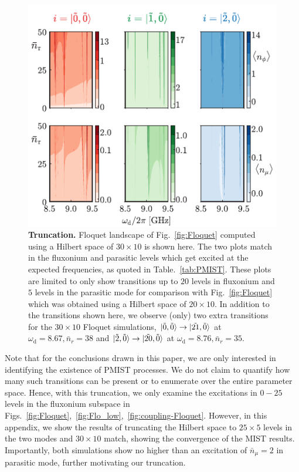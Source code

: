 \documentclass[%
reprint,
superscriptaddress,
 amsmath,amssymb,
 aps,
 prx,
longbibliography,
floatfix,
]{revtex4-2}
\begin{document}
\begin{figure}[t]
        \centering
        \includegraphics[width=\linewidth]{Supp_Fig/Tuncation.pdf}
        \caption{{\bf Truncation.} Floquet landscape of Fig.~\ref{fig:Floquet} computed using a Hilbert space of $30\times 10$ is shown here. The two plots match in the fluxonium and parasitic levels which get excited at the expected frequencies, as quoted in Table.~\ref{tab:PMIST}. These plots are limited to only show transitions up to $20$ levels in fluxonium and $5$ levels in the parasitic mode for comparison with Fig.~\ref{fig:Floquet} which was obtained using a Hilbert space of $20\times 10$. In addition to the transitions shown here, we observe (only) two extra transitions for the $30\times 10$ Floquet simulations, $\ket{\tilde{0},\tilde{0}}\rightarrow\ket{\tilde{21},\tilde{0}}$ at $\omega_\textrm{d}=8.67,\bar n_r=38$ and $\ket{\tilde{2},\tilde{0}}\rightarrow\ket{\tilde{20},\tilde{0}}$ at $\omega_\textrm{d}=8.76,\bar n_r=35$. 
        }
        \label{fig:truncation}
    \end{figure}
    Note that for the conclusions drawn in this paper, we are only interested in identifying the existence of PMIST processes. We do not claim to quantify how many such transitions can be present or to enumerate over the entire parameter space. Hence, with this truncation, we only examine the excitations in $0-25$ levels in the fluxonium subspace in Figs.~\ref{fig:Floquet},~\ref{fig:Flo_low},~\ref{fig:coupling-Floquet}. However, in this appendix, we show the results of truncating the Hilbert space to $25
    \times 5$ levels in the two modes and $30
    \times 10$ match, showing the convergence of the MIST results. Importantly, both simulations show no higher than an excitation of $\bar n_\mu=2$ in parasitic mode, further motivating our truncation.
\end{document}
